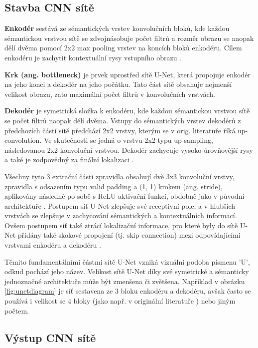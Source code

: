 \subsection{Stavba CNN sítě}
\label{subsec:Chapter221}

\textbf{Enkodér} sestává ze sémantických vrstev konvolučních bloků, kde každou sémantickou vrstvou sítě se zdvojnásobuje počet filtrů a rozměr obrazu se naopak dělí dvěma pomocí 2x2 max pooling vrstev na koncích bloků enkodéru. Cílem enkodéru je zachytit kontextuální rysy vstupního obrazu \cite{unet_success}.

\textbf{Krk (ang. bottleneck)} je prvek uprostřed sítě U-Net, která propojuje enkodér na jeho konci a dekodér na jeho počátku. Tato část sítě obsahuje nejmenší velikost obrazu, zato maximální počet filtrů v konvolučních vrstvách.

\textbf{Dekodér} je symetrická složka k enkodéru, kde každou sémantickou vrstvou sítě se počet filtrů naopak dělí dvěma. Vstupy do sémantických vrstev dekodérů z předchozích částí sítě předchází 2x2 vrstvy, kterým se v orig. literatuře říká up-convolution. Ve skutečnosti se jedná o vrstvu 2x2 typu up-sampling, následovanou 2x2 konvoluční vrstvou. Dekodér zachycuje vysoko-úrovňovější rysy a také je zodpovědný za finální lokalizaci \cite{unet_success}.

Všechny tyto 3 extrační části zpravidla obsahují dvě 3x3 konvoluční vrstvy, zpravidla s odsazením typu valid padding a (1, 1) krokem (ang. stride), aplikovány následně po sobě s ReLU aktivační funkcí, obdobně jako v původní architektuře \cite{unet}. Postupem síť U-Net zlepšuje své receptivní pole, a v hlubších vrstvách se zlepšuje v zachycování sémantických a kontextuálních informací. Ovšem postupem síť také ztrácí lokalizační informace, pro které byly do sítě U-Net přidány také skokové propojení (tj. skip connection) mezi odpovídajícími vrstvami enkodéru a dekodéru \cite{unet_success}.

Těmito fundamentálními částmi sítě U-Net vzniká vizuální podoba písmenu 'U', odkud pochází jeho název. Velikost sítě U-Net díky své symetrické a sémanticky jednoznačné architektuře může být zmenšena či zvětšena. Například v obrázku \ref{fig:unetdiagram} je síť sestavena ze 3 bloku enkodéru a dekodéru, avšak často se používá i velikost se 4 bloky (jako např. v originální literatuře \cite{unet}) nebo jiným počtem.

\subsection{Výstup CNN sítě}
\label{subsec:Chapter222}

